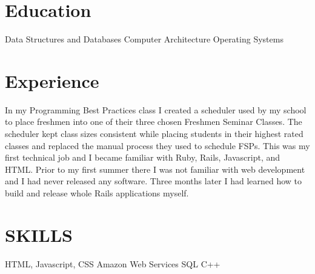 \documentclass[11pt,a4paper,sans]{moderncv}
\begin{document}
\makecvtitle
\section{Education}
 {Data Structures and Databases}
 {Computer Architecture}
 {Operating Systems}

\section{Experience}
{
  In my Programming Best Practices class I created a scheduler used by my
  school to place freshmen into one of their three chosen Freshmen Seminar 
  Classes.
  The scheduler kept class sizes consistent while placing students in their 
  highest rated classes and replaced the manual process they used to schedule
  FSPs.
}
{
  This was my first technical job and I became familiar with
  Ruby, Rails, Javascript, and HTML. Prior to my first summer there I was not familiar with web development and I had never released any software. Three months later
  I had learned how to build and release whole Rails applications myself.
} 

\section{SKILLS}
 {HTML, Javascript, CSS}
 {Amazon Web Services}
 {SQL}
 {C++}
\end{document}
